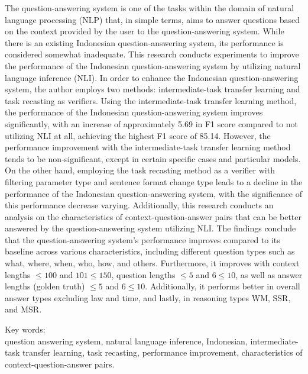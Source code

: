 \noindent The question-answering system is one of the tasks within the domain of natural language processing (NLP) that, in simple terms, aims to answer questions based on the context provided by the user to the question-answering system. While there is an existing Indonesian question-answering system, its performance is considered somewhat inadequate. This research conducts experiments to improve the performance of the Indonesian question-answering system by utilizing natural language inference (NLI). In order to enhance the Indonesian question-answering system, the author employs two methods: intermediate-task transfer learning and task recasting as verifiers. Using the intermediate-task transfer learning method, the performance of the Indonesian question-answering system improves significantly, with an increase of approximately 5.69 in F1 score compared to not utilizing NLI at all, achieving the highest F1 score of 85.14. However, the performance improvement with the intermediate-task transfer learning method tends to be non-significant, except in certain specific cases and particular models. On the other hand, employing the task recasting method as a verifier with filtering parameter type and sentence format change type leads to a decline in the performance of the Indonesian question-answering system, with the significance of this performance decrease varying. Additionally, this research conducts an analysis on the characteristics of context-question-answer pairs that can be better answered by the question-answering system utilizing NLI. The findings conclude that the question-answering system's performance improves compared to its baseline across various characteristics, including different question types such as what, where, when, who, how, and others. Furthermore, it improves with context lengths $\leq100$ and $101\leq150$, question lengths $\leq5$ and $6\leq10$, as well as answer lengths (golden truth) $\leq5$ and $6\leq10$. Additionally, it performs better in overall answer types excluding law and time, and lastly, in reasoning types WM, SSR, and MSR.

\vspace*{0.2cm}

\noindent Key words: \\ question answering system, natural language inference, Indonesian, intermediate-task transfer learning, task recasting, performance improvement, characteristics of context-question-answer pairs. \\

\newpage
